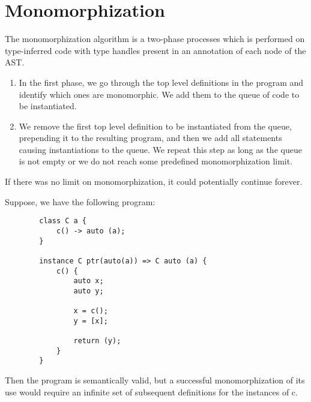 \section{Monomorphization}

The monomorphization algorithm is a two-phase processes which is performed on type-inferred code with type handles present in an annotation of each node of the AST.

\begin{enumerate}
    \item In the first phase, we go through the top level definitions in the program and identify which ones are monomorphic. We add them to the queue of code to be instantiated.

    \item We remove the first top level definition to be instantiated from the queue, prepending it to the resulting program, and then we add all statements causing instantiations to the queue. We repeat this step as long as the queue is not empty or we do not reach some predefined monomorphization limit.
\end{enumerate}


If there was no limit on monomorphization, it could potentially continue forever.

\begin{ex}
    Suppose, we have the following program:

    \begin{lstlisting}
        class C a {
            c() -> auto (a);
        }

        instance C ptr(auto(a)) => C auto (a) {
            c() {
                auto x;
                auto y;

                x = c();
                y = [x];

                return (y);
            }
        }
    \end{lstlisting}

    Then the program is semantically valid, but a successful monomorphization of its use would require an infinite set of subsequent definitions for the instances of c.


\end{ex}

